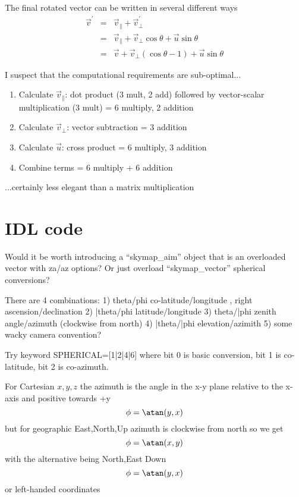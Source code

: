 \documentclass[12pt,twoside,openright]{report}
\begin{document}
\noindent The final rotated vector can be written in several different ways
\begin{subequations}\label{}
\begin{eqnarray}
{\vec v}^\prime &=& {\vec v}_\parallel + {\vec v}_\perp^\prime \\
       &=& {\vec v}_\parallel + {\vec v}_\perp \cos\theta + \vec u \sin\theta \\
       &=& {\vec v} + {\vec v}_\perp (\cos\theta-1) + \vec u \sin\theta
\end{eqnarray}
\end{subequations}

I suspect that the computational requirements are sub-optimal...
\begin{enumerate}
  \item Calculate ${\vec v}_\parallel$: dot product (3 mult, 2 add) followed by vector-scalar multiplication (3 mult) = 6 multiply, 2 addition
  \item Calculate ${\vec v}_\perp$: vector subtraction = 3 addition
  \item Calculate ${\vec u}$: cross product = 6 multiply, 3 addition
  \item Combine terms = 6 multiply + 6 addition
\end{enumerate}
...certainly less elegant than a matrix multiplication

\section{IDL code}

Would it be worth introducing a ``skymap\_aim'' object that is an overloaded vector with za/az options?
Or just overload ``skymap\_vector'' spherical conversions?

There are 4 combinations:
 1) theta/phi        co-latitude/longitude , right ascension/declination
 2) \bar{theta}/phi  latitude/longitude
 3) theta/\bar{phi}  zenith angle/azimuth (clockwise from north)
 4) \bar{theta}/\bar{phi} elevation/azimith
 5) some wacky camera convention?

Try keyword SPHERICAL=[1|2|4|6] where bit 0 is basic conversion, bit 1 is co-latitude, bit 2 is co-azimuth.

For Cartesian $x,y,z$ the azimuth is the angle in the x-y plane relative to the x-axis and positive towards +y
$$ \phi = \atan(y,x) $$
but for geographic East,North,Up azimuth is clockwise from north so we get
$$ \phi = \atan(x,y) $$
with the alternative being North,East Down
$$ \phi = \atan(y,x) $$
or left-handed coordinates
\end{document}
